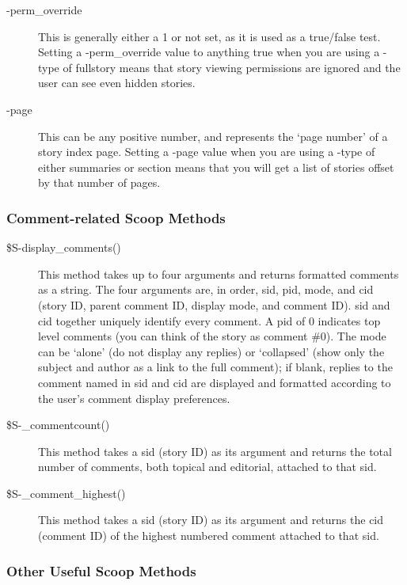 \begin{description}
\begin{description}
\item[-perm\_override] This is generally either a 1 or not set, as it is used as a true/false test. Setting a -perm\_override value to anything true when you are using a -type of fullstory means that story viewing permissions are ignored and the user can see even hidden stories.
\item[-page] This can be any positive number, and represents the `page number' of a story index page. Setting a -page value when you are using a -type of either summaries or section means that you will get a list of stories offset by that number of pages.
\end{description}

\end{description}

\subsubsection{Comment-related Scoop Methods}

\begin{description}
\item[\$S-\latexhtml{$>$}{>}display\_comments()] This method takes up to four arguments and returns formatted comments as a string. The four arguments are, in order, sid, pid, mode, and cid (story ID, parent comment ID, display mode, and comment ID). sid and cid together uniquely identify every comment. A pid of 0 indicates top level comments (you can think of the story as comment \#0). The mode can be `alone' (do not display any replies) or `collapsed' (show only the subject and author as a link to the full comment); if blank, replies to the comment named in sid and cid are displayed and formatted according to the user's comment display preferences.
\item[\$S-\latexhtml{$>$}{>}\_commentcount()] This method takes a sid (story ID) as its argument and returns the total number of comments, both topical and editorial, attached to that sid.
\item[\$S-\latexhtml{$>$}{>}\_comment\_highest()] This method takes a sid (story ID) as its argument and returns the cid (comment ID) of the highest numbered comment attached to that sid.

\end{description}

\subsubsection{Other Useful Scoop Methods}

